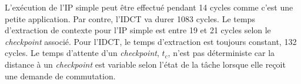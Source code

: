 L'exécution de l'IP simple peut être effectué pendant 14 cycles comme c'est une petite application. Par contre, l'IDCT
va durer 1083 cycles. Le temps d'extraction de contexte pour l'IP simple est entre 19 et 21 cycles
selon le \emph{checkpoint} associé. Pour l'IDCT, le temps d'extraction est toujours constant, 132 cycles. Le temps d'attente
d'un \emph{checkpoint}, $t_c$, n'est pas déterministe car la distance à un \emph{checkpoint} est variable selon
l'état de la tâche lorsque elle reçoit une demande de commutation. 


